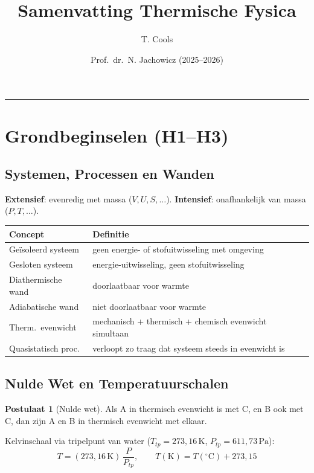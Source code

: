 \documentclass[a4paper,twoside,10pt]{article}
\title{\Large\bfseries Samenvatting Thermische Fysica}
\author{T. Cools}
\date{Prof.\ dr.\ N. Jachowicz (2025--2026)}
\theoremstyle{definition}
\newtheorem{postulate}{Postulaat}[section]
\begin{document}
\maketitle
\tableofcontents
\bigskip\hrule\bigskip

\section{Grondbeginselen (H1--H3)}

\subsection{Systemen, Processen en Wanden}

\textbf{Extensief}: evenredig met massa ($V, U, S, \ldots$).\quad
\textbf{Intensief}: onafhankelijk van massa ($P, T, \ldots$).

\begin{center}
\renewcommand{\arraystretch}{1.2}
\begin{tabular}{@{}ll@{}}
\toprule
Concept & Definitie \\
\midrule
Geïsoleerd systeem  & geen energie- of stofuitwisseling met omgeving \\
Gesloten systeem    & energie-uitwisseling, geen stofuitwisseling \\
Diathermische wand  & doorlaatbaar voor warmte \\
Adiabatische wand   & niet doorlaatbaar voor warmte \\
Therm.\ evenwicht   & mechanisch + thermisch + chemisch evenwicht simultaan \\
Quasistatisch proc. & verloopt zo traag dat systeem steeds in evenwicht is \\
\bottomrule
\end{tabular}
\end{center}

\subsection{Nulde Wet en Temperatuurschalen}

\begin{postulate}[Nulde wet]
Als A in thermisch evenwicht is met C, en B ook met C,
dan zijn A en B in thermisch evenwicht met elkaar.
\end{postulate}

Kelvinschaal via tripelpunt van water
($T_{tp}=273{,}16\,\mathrm{K}$, $P_{tp}=611{,}73\,\mathrm{Pa}$):
\[
  T = (273{,}16\,\mathrm{K})\,\frac{P}{P_{tp}},
  \qquad
  T(\mathrm{K}) = T({}^{\circ}\mathrm{C}) + 273{,}15
\]
\end{document}
